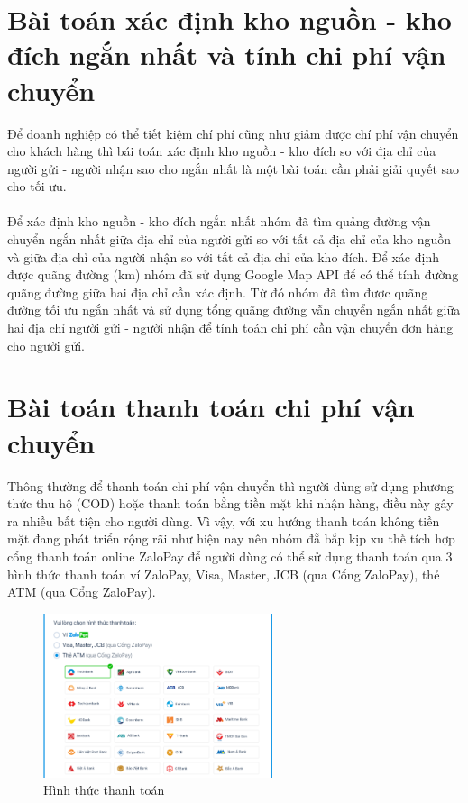         
			
		\section{Bài toán xác định kho nguồn - kho đích ngắn nhất và tính chi phí vận chuyển}
			Để doanh nghiệp có thể tiết kiệm chí phí cũng như giảm được chí phí vận chuyển cho khách hàng thì bái toán xác định kho nguồn - kho đích so với địa chỉ của người gửi - người nhận sao cho ngắn nhất là một bài toán cần phải giải quyết sao cho tối ưu.\\\\
			\indent	Để xác định kho nguồn - kho đích ngắn nhất nhóm đã tìm quảng đường vận chuyển ngắn nhất giữa địa chỉ của người gửi so với tất cả địa chỉ của kho nguồn và giữa địa chỉ của người nhận so với tất cả địa chỉ của kho đích. Để xác định được quãng đường (km) nhóm đã sử dụng Google Map API để có thể tính đường quãng đường giữa hai địa chỉ cần xác định. Từ đó nhóm đã tìm được quãng đường tối ưu ngắn nhất và sử dụng tổng quãng đường vẫn chuyển ngắn nhất giữa hai địa chỉ người gửi - người nhận để tính toán chi phí cần vận chuyển đơn hàng cho người gửi. 
		\section{Bài toán thanh toán chi phí vận chuyển} 
		Thông thường để thanh toán chi phí vận chuyển thì người dùng sử dụng phương thức thu hộ (COD) hoặc thanh toán bằng tiền mặt khi nhận hàng, điều này gây ra nhiều bất tiện cho người dùng. Vì vậy, với xu hướng thanh toán không tiền mặt đang phát triển rộng rãi như hiện nay nên nhóm đẵ bắp kịp xu thế tích hợp cổng thanh toán online ZaloPay để người dùng có thể sử dụng thanh toán qua 3 hình thức thanh toán ví ZaloPay, Visa, Master, JCB (qua Cổng ZaloPay), thẻ ATM (qua Cổng ZaloPay).
		
		\begin{figure}[H]
			\includegraphics[width=0.6\textwidth]{Images/payment.png}
			\centering
			\linebreak
			\caption{Hình thức thanh toán}
		\end{figure}
